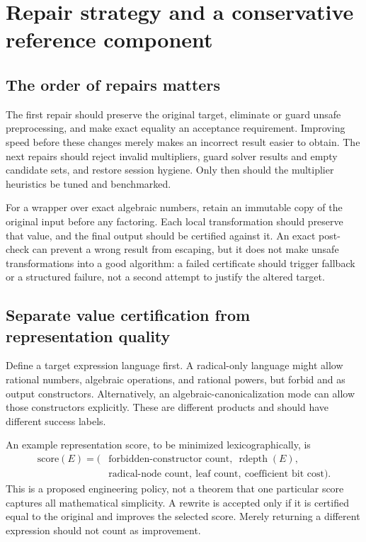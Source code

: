 \documentclass[11pt,letterpaper]{article}
\newcommand{\code}[1]{\texttt{\detokenize{#1}}}
\DeclareMathOperator{\raddepth}{rdepth}
\theoremstyle{definition}
\theoremstyle{remark}
\begin{document}
\section{Repair strategy and a conservative reference component}
\label{sec:repair}
\subsection{The order of repairs matters}
The first repair should preserve the original target, eliminate or guard
unsafe preprocessing, and make exact equality an acceptance requirement.
Improving speed before these changes merely makes an incorrect result easier
to obtain. The next repairs should reject invalid multipliers, guard solver
results and empty candidate sets, and restore session hygiene. Only then
should the multiplier heuristics be tuned and benchmarked.

For a wrapper over exact algebraic numbers, retain an immutable copy of the
original input before any factoring. Each local transformation should preserve
that value, and the final output should be certified against it. An exact
post-check can prevent a wrong result from escaping, but it does not make
unsafe transformations into a good algorithm: a failed certificate should
trigger fallback or a structured failure, not a second attempt to justify the
altered target.

\subsection{Separate value certification from representation quality}
Define a target expression language first. A radical-only language might
allow rational numbers, algebraic operations, and rational powers, but forbid
\code{Root} and \code{AlgebraicNumber} as output constructors. Alternatively,
an algebraic-canonicalization mode can allow those constructors explicitly.
These are different products and should have different success labels.

An example representation score, to be minimized lexicographically, is
\[
 \begin{aligned}
 \mathrm{score}(E)=(&\text{forbidden-constructor count},\ \raddepth(E),\\
                   &\text{radical-node count},\ \text{leaf count},\
                     \text{coefficient bit cost}).
 \end{aligned}
\]
This is a proposed engineering policy, not a theorem that one particular
score captures all mathematical simplicity. A rewrite is accepted only if it
is certified equal to the original and improves the selected score. Merely
returning a different expression should not count as improvement.
\end{document}
